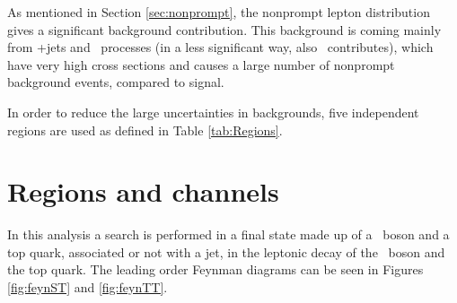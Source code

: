 As mentioned in Section \ref{sec:nonprompt}, the nonprompt  lepton distribution gives a significant background contribution. This background is coming mainly from \DY+jets and \ttbar\ processes (in a less significant way, also \WW\ contributes), which have very high cross sections and causes a large number of nonprompt  background events, compared to signal.

In order to reduce the large uncertainties in backgrounds, five independent regions are used as defined in Table  \ref{tab:Regions}. 
\section{Regions and channels}
\label{sec:regions}
In this analysis a search is performed in a final state made up of a \PZ\ boson and a top quark, associated or not with a jet, in the leptonic decay of the \PZ\ boson and the top quark. The leading order Feynman diagrams can be seen in Figures \ref{fig:feynST} and \ref{fig:feynTT}.  


